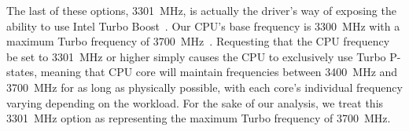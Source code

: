 The last of these options, 3301~MHz, is actually the driver's way of exposing
the ability to use Intel Turbo Boost~\cite{linuxIntelPState}. Our CPU's base
frequency is 3300~MHz with a maximum Turbo frequency of 3700~MHz~\cite{cpuSpecs}.
Requesting that the CPU frequency be set to 3301~MHz or higher simply causes
the CPU to exclusively use Turbo P-states, meaning that CPU core will maintain
frequencies between 3400~MHz and 3700~MHz for as long as physically possible,
with each core's individual frequency varying depending on the workload. For the
sake of our analysis, we treat this 3301~MHz option as representing the maximum
Turbo frequency of 3700~MHz.
